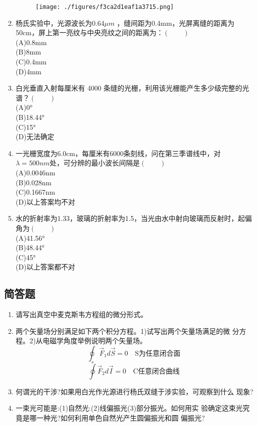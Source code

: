 \begin{enumerate}
\begin{figure}[ht]
\texttt{[image: ./figures/f3ca2d1eaf1a3715.png]}
\caption{} \label{fig_CD09_1}
\end{figure}
\item 杨氏实验中，光源波长为0.64$\mu m$ ，缝间距为0.4mm，光屏离缝的距离为50cm，屏上第一亮纹与中央亮纹之间的距离为：$(\qquad)$\\
(A)0.8mm\\
(B)8mm\\
(C)0.4mm\\
(D)4mm
\item 白光垂直入射每厘米有 4000 条缝的光栅，利用该光栅能产生多少级完整的光谱？$(\qquad)$\\
(A)0°\\
(B)18.44°\\
(C)15°\\
(D)无法确定
\item 一光栅宽度为6.0cm，每厘米有6000条刻线，问在第三季谱线中，对$\lambda=500nm$处，可分辨的最小波长间隔是$(\qquad)$\\
(A)0.0046nm\\
(B)0.028nm\\
(C)0.1667nm\\
(D)以上答案均不对
\item 水的折射率为1.33，玻璃的折射率为1.5，当光由水中射向玻璃而反射时，起偏角为$(\qquad)$\\
(A)41.56°\\
(B)48.44°\\
(C)45°\\
(D)以上答案都不对
\end{enumerate}
\subsection{简答题}
\begin{enumerate}
\item 请写出真空中麦克斯韦方程组的微分形式。
\item 两个矢量场分别满足如下两个积分方程。1)试写出两个矢量场满足的微
分方程。2)从电磁学角度举例说明两个矢量场。
\begin{equation}
\oint_s \vec F_1d\vec S=0 \quad \text{S为任意闭合面}~
\end{equation}
\begin{equation}
\oint \vec F_2d\vec I=0 \quad \text{C任意闭合曲线}~
\end{equation}
\item 何谓光的干涉?如果用白光作光源进行杨氏双缝于涉实验，可观察到什么
现象?
\item 一束光可能是:(1)自然光:(2)线偏振光(3)部分振光。如何用实
验确定这束光究竟是哪一种光?如何利用单色自然光产生圆偏振光和圆
偏振光?
\end{enumerate}
